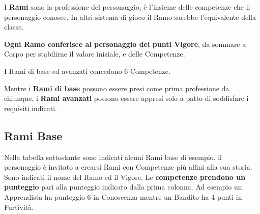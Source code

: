 \documentclass[12pt,a4paper,twoside,openany]{book}
\begin{document}
\begin{multicols}{2}

I \textbf{Rami} sono la professione del personaggio, è l'insieme delle competenze che il personaggio conosce. In altri sistema di gioco il Ramo sarebbe l'equivalente della classe.

\textbf{Ogni Ramo conferisce al personaggio dei punti Vigore}, da sommare a Corpo per stabilirne il valore iniziale, e delle Competenze.

I Rami di base ed avanzati concedono 6 Competenze.

Mentre i \textbf{Rami di base} possono essere presi come prima professione da chiunque, i\textbf{ Rami avanzati} possono essere appresi solo a patto di soddisfare i requisiti indicati.

\subsection{Rami Base}

Nella tabella sottostante sono indicati alcuni Rami base di esempio. il personaggio è invitato a crearsi Rami con Competenze più affini alla sua storia.
Sono indicati il nome del Ramo ed il Vigore. Le \textbf{competenze prendono un punteggio} pari alla punteggio indicato dalla prima colonna. Ad esempio un Apprendista ha punteggio 6 in Conoscenza mentre un Bandito ha 4 punti in Furtività.

\end{multicols}
\end{document}
